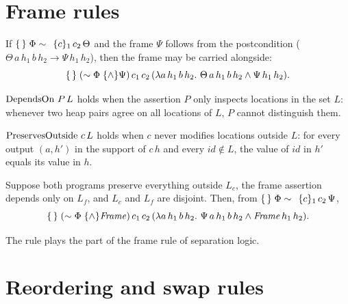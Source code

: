 \section{Frame rules}

\begin{theorem}[Frame]
  \label{thm:r-frame}
  \leanok
  If $\{\,\}\;\Phi \sim \,\;\{c\}_1\,c_2\,\Theta$ and the frame $\Psi$ follows from the
  postcondition ($\Theta\,a\,h_1\,b\,h_2 \to \Psi\,h_1\,h_2$), then the frame may
  be carried alongside:
  \[
    \{\,\}\;( \sim \Phi\;\{\wedge\} \Psi)\,c_1\,c_2\,(\lambda a\,h_1\,b\,h_2.\ \Theta\,a\,h_1\,b\,h_2 \wedge \Psi\,h_1\,h_2).
  \]
\end{theorem}

\begin{definition}
  \label{def:depends-on}
  \leanok
  $\operatorname{DependsOn}\,P\,L$ holds when the assertion $P$ only inspects locations in the
  set $L$: whenever two heap pairs agree on all locations of $L$, $P$ cannot
  distinguish them.
\end{definition}

\begin{definition}
  \label{def:preserves-outside}
  \leanok
  $\operatorname{PreservesOutside}\,c\,L$ holds when $c$ never modifies locations outside $L$:
  for every output $(a,h')$ in the support of $c\,h$ and every $\mathit{id} \notin L$,
  the value of $\mathit{id}$ in $h'$ equals its value in $h$.
\end{definition}

\begin{theorem}
  \label{thm:r-frame-local}
  \leanok
  Suppose both programs preserve everything outside $L_c$, the frame assertion
  depends only on $L_f$, and $L_c$ and $L_f$ are disjoint. Then, from
  $\{\,\}\;\Phi \sim \,\;\{c\}_1\,c_2\,\Psi$,
  \[
    \{\,\}\;( \sim \Phi\;\{\wedge\} \mathit{Frame})\,c_1\,c_2\,
      (\lambda a\,h_1\,b\,h_2.\ \Psi\,a\,h_1\,b\,h_2 \wedge \mathit{Frame}\,h_1\,h_2).
  \]
\end{theorem}

The rule plays the part of the frame rule of separation logic.

\section{Reordering and swap rules}

